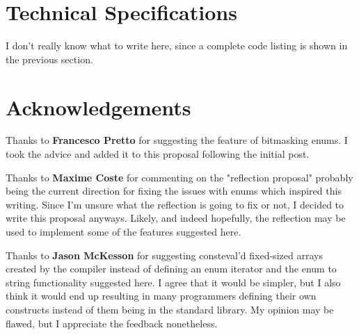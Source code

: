 \documentclass[
  format=manuscript,
  screen=true,
  review=false,
  nonacm=true,
  timestamp=true,
  balance=false]{acmart}
\begin{document}
\section{Technical Specifications}

I don't really know what to write here, since a complete code listing is shown
in the previous section.


\section{Acknowledgements}

Thanks to \textbf{Francesco Pretto} for suggesting the feature of bitmasking enums.
I took the advice and added it to this proposal following the initial post.

\noindent
Thanks to \textbf{Maxime Coste} for commenting on the "reflection proposal" probably
being the current direction for fixing the issues with enums which inspired this writing.
Since I'm unsure what the reflection is going to fix or not, I decided to write this
proposal anyways. Likely, and indeed hopefully, the reflection may be used to
implement some of the features suggested here.

\noindent
Thanks to \textbf{Jason McKesson} for suggesting consteval'd fixed-sized arrays created
by the compiler instead of defining an enum iterator and the enum to string functionality
suggested here. I agree that it would be simpler, but I also think it would end up
resulting in many programmers defining their own constructs instead of them being
in the standard library. My opinion may be flawed, but I appreciate the feedback
nonetheless.



\end{document}
